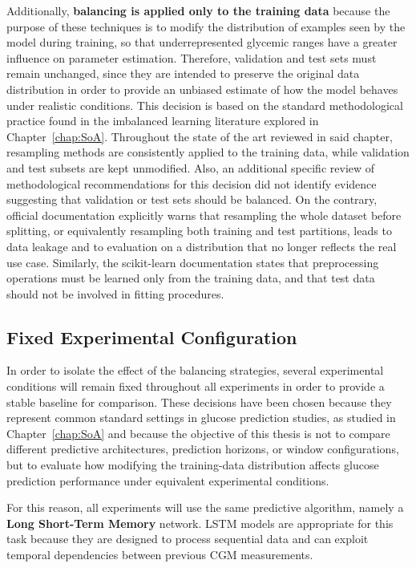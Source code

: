 Additionally, \textbf{balancing is applied only to the training data} because the purpose of these techniques is to modify the distribution of examples seen by the model during training, so that underrepresented glycemic ranges have a greater influence on parameter estimation. Therefore, validation and test sets must remain unchanged, since they are intended to preserve the original data distribution in order to provide an unbiased estimate of how the model behaves under realistic conditions. This decision is based on the standard methodological practice found in the imbalanced learning literature explored in Chapter~\ref{chap:SoA}. Throughout the state of the art reviewed in said chapter, resampling methods are consistently applied to the training data, while validation and test subsets are kept unmodified. Also, an additional specific review of methodological recommendations for this decision did not identify evidence suggesting that validation or test sets should be balanced. On the contrary, official documentation \cite{imbalanced_learn} explicitly warns that resampling the whole dataset before splitting, or equivalently resampling both training and test partitions, leads to data leakage and to evaluation on a distribution that no longer reflects the real use case. Similarly, the scikit-learn documentation \cite{scikit_learn_common_pitfalls} states that preprocessing operations must be learned only from the training data, and that test data should not be involved in fitting procedures.

\subsection{Fixed Experimental Configuration}
\label{subsec:experimental_methodology_fixed_configuration}

In order to isolate the effect of the balancing strategies, several experimental conditions will remain fixed throughout all experiments in order to provide a stable baseline for comparison. These decisions have been chosen because they represent common standard settings in glucose prediction studies, as studied in Chapter~\ref{chap:SoA} and because the objective of this thesis is not to compare different predictive architectures, prediction horizons, or window configurations, but to evaluate how modifying the training-data distribution affects glucose prediction performance under equivalent experimental conditions.

For this reason, all experiments will use the same predictive algorithm, namely a \textbf{Long Short-Term Memory} network. LSTM models are appropriate for this task because they are designed to process sequential data and can exploit temporal dependencies between previous CGM measurements.

